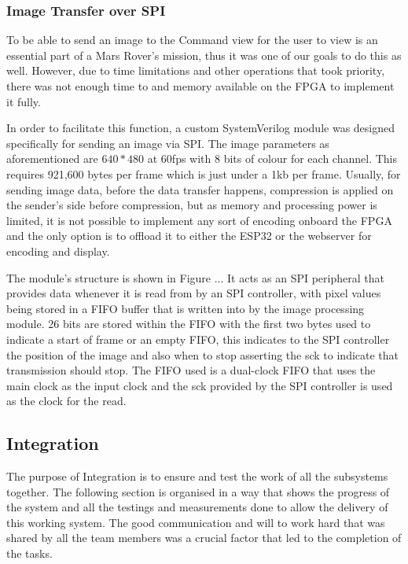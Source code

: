 \documentclass[a4paper]{article}
\begin{document}
\subsubsection{Image Transfer over SPI}

To be able to send an image to the Command view for the user to view is an essential
part of a Mars Rover's mission, thus it was one of our goals to do this as well. However,
due to time limitations and other operations that took priority, there was not enough time
 to and memory available on the FPGA to implement it fully. 

In order to facilitate this function, a custom SystemVerilog module was designed specifically 
for sending an image via SPI. The image parameters as aforementioned are \(640 *480\) at 60fps 
with 8 bits of colour for each channel. This requires 921,600 bytes per frame which is just 
under a 1kb per frame. Usually, for sending image data, before the data transfer happens, 
compression is applied on the sender's side before compression, but as memory and processing
power is limited, it is not possible to implement any sort of encoding onboard the FPGA and the
only option is to offload it to either the ESP32 or the webserver for encoding and display. 

The module's structure is shown in Figure ... It acts as an SPI peripheral that provides 
data whenever it is read from by an SPI controller, with pixel values being stored in a FIFO 
buffer that is written into by the image processing module. 26 bits are stored within the FIFO
with the first two bytes used to indicate a start of frame or an empty FIFO, this indicates to the 
SPI controller the position of the image and also when to stop asserting the sck to indicate that 
transmission should stop. The FIFO used is a dual-clock FIFO that uses the main clock as the input
clock and the sck provided by the SPI controller is used as the clock for the read.  


\subsection{Integration}
The purpose of Integration is to ensure and test the work of all the subsystems together. The following section is organised in a 
way that shows the progress of the system and all the testings and measurements done to allow the delivery of this working system. 
The good communication and will to work hard that was shared by all the team members was a crucial factor that led to the completion of the tasks.
\end{document}
